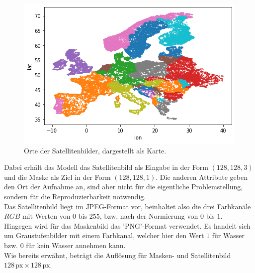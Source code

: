\begin{figure}
    \centering
    \includegraphics[scale=0.5]{content/img/map.png}
    \caption{Orte der Satellitenbilder, dargestellt als Karte.}
\end{figure}
\FloatBarrier
Dabei erhält das Modell das Satellitenbild als Eingabe in der Form $(128, 128, 3)$ und die Maske als Ziel in der Form $(128, 128, 1)$.
Die anderen Attribute geben den Ort der Aufnahme an, sind aber nicht für die eigentliche Problemstellung, sondern für die Reproduzierbarkeit notwendig.
\\
Das Satellitenbild liegt im JPEG-Format vor, beinhaltet also die drei Farbkanäle $RGB$ mit Werten von $0$ bis $255$, bzw. nach der Normierung von $0$ bis $1$.
\\
Hingegen wird für das Maskenbild das 'PNG'-Format verwendet.
Es handelt sich um Graustufenbilder mit einem Farbkanal, welcher hier den Wert $1$ für Wasser bzw. $0$ für kein Wasser annehmen kann.
\\
Wie bereits erwähnt, beträgt die Auflösung für Masken- und Satellitenbild $128 \, \text{px} \times 128 \, \text{px}$.